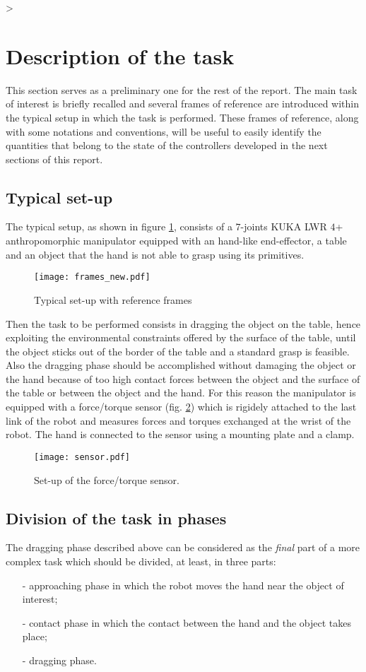 >\section{Description of the task}\label{sec:task_description}
This section serves as a preliminary one for the rest of the report. The main task
of interest is briefly recalled and several frames of reference are introduced within
the typical setup in which the task is performed. These frames of reference, along
with some notations and conventions, will be useful to easily identify the quantities
that belong to the state of the controllers developed in the next sections of this report.

\subsection{Typical set-up}
The typical setup, as shown in figure \ref{fig:frames}, consists of a $7$-joints KUKA LWR $4$+
anthropomorphic manipulator equipped with an hand-like end-effector, a table and an object that the hand is not
able to grasp using its primitives.
\begin{figure}[h]
  \centering
  \texttt{[image: frames\_new.pdf]}
  \caption{Typical set-up with reference frames \label{fig:frames}}
\end{figure}
Then the task to be performed consists in dragging the object on the table, hence exploiting
the environmental constraints offered by the surface of the table, until the object sticks
out of the border of the table and a standard grasp is feasible. Also the dragging phase should
be accomplished without damaging the object or the hand because of too high contact forces between
the object and the surface of the table or between the object and the hand.
For this reason the manipulator is equipped with a force/torque sensor (fig. \ref{fig:sensor}) which is rigidely attached
to the last link of the robot and measures forces and torques exchanged at the wrist of the robot.
The hand is connected to the sensor using a mounting plate and a clamp.
\begin{figure}[h]
  \centering
  \texttt{[image: sensor.pdf]}
  \caption{Set-up of the force/torque sensor.\label{fig:sensor}}
\end{figure}

\subsection{Division of the task in phases}\label{sec:task_division}
The dragging phase described above can be considered as the \emph{final} part of a more
complex task which should be divided, at least, in three parts:
\begin{itemize}
\item[-] approaching phase in which the robot moves the hand near the object of interest;
\item[-] contact phase in which the contact between the hand and the object takes place;
\item[-] dragging phase.
\end{itemize}

